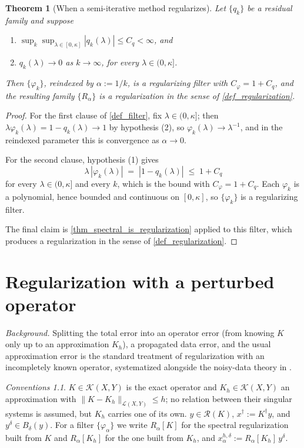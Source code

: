 \documentclass[a4paper]{report}
\theoremstyle{plain}
\newtheorem{theorem}{Theorem}[chapter]
\theoremstyle{definition}
\theoremstyle{remark}
\newtheorem{assumptions}[theorem]{Conventions}
\newcommand{\Ll}{\mathcal{L}}
\newcommand{\Kk}{\mathcal{K}}
\newcommand{\Ran}{\mathcal{R}}
\newcommand{\dg}{^{\dagger}}
\begin{document}
\begin{theorem}[When a semi-iterative method regularizes]
  \label{thm_semi_iterative_regularization}
  Let $\{q_k\}$ be a residual family and suppose
  \begin{enumerate}
    \item $\sup_{k}\sup_{\lambda \in [0,\kappa]}|q_k(\lambda)| \le C_q < \infty$, and
    \item $q_k(\lambda) \to 0$ as $k \to \infty$, for every $\lambda \in (0,\kappa]$.
  \end{enumerate}
  Then $\{\varphi_k\}$, reindexed by $\alpha := 1/k$, is a regularizing filter with
  $C_{\varphi} = 1 + C_q$, and the resulting family $\{R_{\alpha}\}$ is a regularization
  in the sense of \cref{def_regularization}.
\end{theorem}
\begin{proof}
  For the first clause of \cref{def_filter}, fix $\lambda \in (0,\kappa]$; then
  $\lambda\varphi_k(\lambda) = 1-q_k(\lambda) \to 1$ by hypothesis (2), so
  $\varphi_k(\lambda) \to \lambda^{-1}$, and in the reindexed parameter this is
  convergence as $\alpha \to 0$.

  For the second clause, hypothesis (1) gives
  \[
    \lambda\,|\varphi_k(\lambda)| \;=\; |1-q_k(\lambda)| \;\le\; 1 + C_q
  \]
  for every $\lambda \in (0,\kappa]$ and every $k$, which is the bound with
  $C_{\varphi} = 1+C_q$.  Each $\varphi_k$ is a polynomial, hence bounded and continuous
  on $[0,\kappa]$, so $\{\varphi_k\}$ is a regularizing filter.

  The final claim is \cref{thm_spectral_is_regularization} applied to this filter, which
  produces a regularization in the sense of \cref{def_regularization}.
\end{proof}


\chapter{Regularization with a perturbed operator}
\label{ch_21_perturbed_operator}

\noindent\emph{Background.} Splitting the total error into an operator error (from
knowing $K$ only up to an approximation $K_h$), a propagated data error, and the usual
approximation error is the standard treatment of regularization with an incompletely
known operator, systematized alongside the noisy-data theory in
\citet{EnglHankeNeubauer1996}.

\begin{assumptions}
  \label{asm_regularization_with_perturbed}
  $K \in \Kk(X,Y)$ is the exact operator and
$K_h \in \Kk(X,Y)$ an approximation with $\|K-K_h\|_{\Ll(X,Y)} \le h$; no relation between
their singular systems is assumed, but $K_h$ carries one of its own.  $y \in
\Ran(K)$, $x\dg := K\dg y$, and $y^{\delta} \in B_{\delta}(y)$.  For a filter
$\{\varphi_{\alpha}\}$ we write $R_{\alpha}[K]$ for the spectral regularization built from
$K$ and $R_{\alpha}[K_h]$ for the one built from $K_h$, and
$x^{h,\delta}_{\alpha} := R_{\alpha}[K_h]\,y^{\delta}$.
\end{assumptions}
\end{document}
